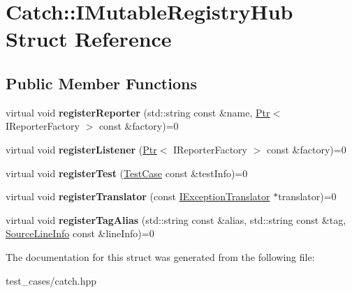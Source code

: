 \hypertarget{structCatch_1_1IMutableRegistryHub}{}\section{Catch\+:\+:I\+Mutable\+Registry\+Hub Struct Reference}
\label{structCatch_1_1IMutableRegistryHub}
\subsection*{Public Member Functions}
\begin{DoxyCompactItemize}
\item 
\mbox{\label{structCatch_1_1IMutableRegistryHub_aab72d0aa1fa14627f1a6a4c893ae0a12}} 
virtual void {\bfseries register\+Reporter} (std\+::string const \&name, \hyperlink{classCatch_1_1Ptr}{Ptr}$<$ I\+Reporter\+Factory $>$ const \&factory)=0
\item 
\mbox{\label{structCatch_1_1IMutableRegistryHub_ae06fcb90ba3f2b389d450cd81e229276}} 
virtual void {\bfseries register\+Listener} (\hyperlink{classCatch_1_1Ptr}{Ptr}$<$ I\+Reporter\+Factory $>$ const \&factory)=0
\item 
\mbox{\label{structCatch_1_1IMutableRegistryHub_a11b85c6744d88c9f83fe16ad4a8dd451}} 
virtual void {\bfseries register\+Test} (\hyperlink{classCatch_1_1TestCase}{Test\+Case} const \&test\+Info)=0
\item 
\mbox{\label{structCatch_1_1IMutableRegistryHub_ae6825365102693cf7707db022a2c2b49}} 
virtual void {\bfseries register\+Translator} (const \hyperlink{structCatch_1_1IExceptionTranslator}{I\+Exception\+Translator} $\ast$translator)=0
\item 
\mbox{\label{structCatch_1_1IMutableRegistryHub_abf2e386b6f94f615719ada711adbf822}} 
virtual void {\bfseries register\+Tag\+Alias} (std\+::string const \&alias, std\+::string const \&tag, \hyperlink{structCatch_1_1SourceLineInfo}{Source\+Line\+Info} const \&line\+Info)=0
\end{DoxyCompactItemize}


The documentation for this struct was generated from the following file\+:\begin{DoxyCompactItemize}
\item 
test\+\_\+cases/catch.\+hpp\end{DoxyCompactItemize}
